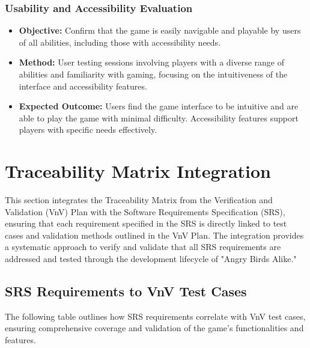 \documentclass[12pt]{article}
\begin{document}
\subsubsection{Usability and Accessibility Evaluation}
\begin{itemize}
    \item \textbf{Objective:} Confirm that the game is easily navigable and playable by users of all abilities, including those with accessibility needs.
    \item \textbf{Method:} User testing sessions involving players with a diverse range of abilities and familiarity with gaming, focusing on the intuitiveness of the interface and accessibility features.
    \item \textbf{Expected Outcome:} Users find the game interface to be intuitive and are able to play the game with minimal difficulty. Accessibility features support players with specific needs effectively.
\end{itemize}

\section{Traceability Matrix Integration}
This section integrates the Traceability Matrix from the Verification and Validation (VnV) Plan with the Software Requirements Specification (SRS), ensuring that each requirement specified in the SRS is directly linked to test cases and validation methods outlined in the VnV Plan. The integration provides a systematic approach to verify and validate that all SRS requirements are addressed and tested through the development lifecycle of "Angry Birds Alike."

\subsection{SRS Requirements to VnV Test Cases}
The following table outlines how SRS requirements correlate with VnV test cases, ensuring comprehensive coverage and validation of the game's functionalities and features.
\end{document}
